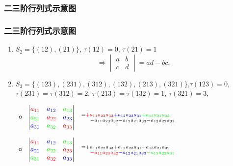 \subsubsection{二三阶行列式示意图}
\begin{frame}\frametitle{二三阶行列式示意图}
\begin{example}
\begin{enumerate}
\item $S_2=\{(12),(21)\}$, \pp $\tau(12)=0$, $\tau(21)=1$ \pp
\[\Rightarrow \begin{vmatrix}a&b\\c&d\end{vmatrix}=ad-bc.\]
\pp
\item $S_3=\{(123),(231),(312),(132),(213),(321)\}$,\pp  $\tau(123)=0$, $\tau(231)=\tau(312)=2$, $\tau(213)=\tau(132)=1$, $\tau(321)=3$,
\pp
\begin{itemize}
\item $\begin{vmatrix}
\red{a_{11}}&\blue{a_{12}}&\green{a_{13}}\\
\green{a_{21}}&\red{a_{22}}&\blue{a_{23}}\\
\blue{a_{31}}&\green{a_{32}}&\red{a_{33}}\\
\end{vmatrix}
{=\red{+a_{11}a_{22}a_{33}} \blue{+a_{12}a_{23}a_{31}} \green{+a_{13}a_{21}a_{32}} \atop \qquad -a_{11}a_{23}a_{32}-a_{12}a_{21}a_{33}-a_{13}a_{22}a_{31}}$
\pp
\item $\begin{vmatrix}
\red{a_{11}}&\blue{a_{12}}&\green{a_{13}}\\
\blue{a_{21}}&\green{a_{22}}&\red{a_{23}}\\
\green{a_{31}}&\red{a_{32}}&\blue{a_{33}}\\
\end{vmatrix}
{=+a_{11}a_{22}a_{33}+a_{12}a_{23}a_{31}+a_{13}a_{21}a_{32}\atop \qquad \red{-a_{11}a_{23}a_{32}} \blue{-a_{12}a_{21}a_{33}} \green{-a_{13}a_{22}a_{31}}}$
\end{itemize}
\end{enumerate}
\end{example}
\end{frame}





